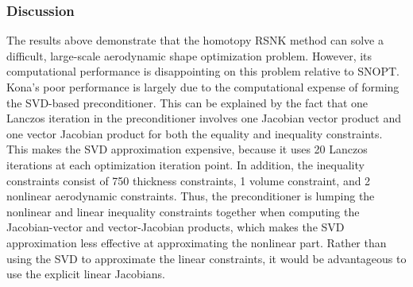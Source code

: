 \subsubsection{Discussion}
The results above demonstrate that the homotopy RSNK method can solve 
a difficult, large-scale aerodynamic shape optimization problem.
However, its computational performance is disappointing on this problem relative to SNOPT. 
Kona's poor performance is largely due to the computational expense of forming the SVD-based 
preconditioner. This can be explained by the fact that one Lanczos iteration in the preconditioner involves  
one Jacobian vector product and one vector Jacobian product for both the equality and inequality constraints. This makes the SVD approximation expensive, because it uses 20 Lanczos iterations at each optimization iteration point. In addition, the inequality constraints consist of 750 thickness constraints, 1 volume constraint,  and 2 nonlinear aerodynamic constraints. Thus, the preconditioner is lumping the nonlinear and linear inequality constraints together when computing the Jacobian-vector and vector-Jacobian products, which makes the SVD approximation less effective at approximating the nonlinear part.  Rather than using the SVD to approximate the linear constraints, it would be advantageous to use the explicit linear Jacobians. 




